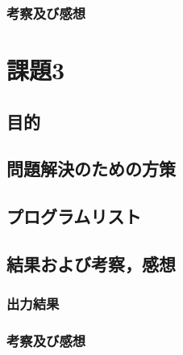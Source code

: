 \documentclass[a4paper]{ltjsarticle}
\begin{document}
\subsubsection{考察及び感想}
\section{課題3}
\subsection{目的}
\subsection{問題解決のための方策}
\subsection{プログラムリスト}
\subsection{結果および考察，感想}
\subsubsection{出力結果}
\subsubsection{考察及び感想}
\end{document}
